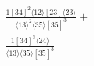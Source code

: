 \documentclass[varwidth, border=5pt]{standalone}
\begin{document}
\begin{my}
$\begin{gathered}
\scriptscriptstyle\frac{1[34]^2⟨12⟩[23]⟨23⟩}{⟨13⟩^2⟨35⟩[35]^3}+\\
\scriptscriptstyle\frac{1[34]^3⟨24⟩}{⟨13⟩⟨35⟩[35]^3}\phantom{+}
\end{gathered}$
\end{my}
\end{document}
